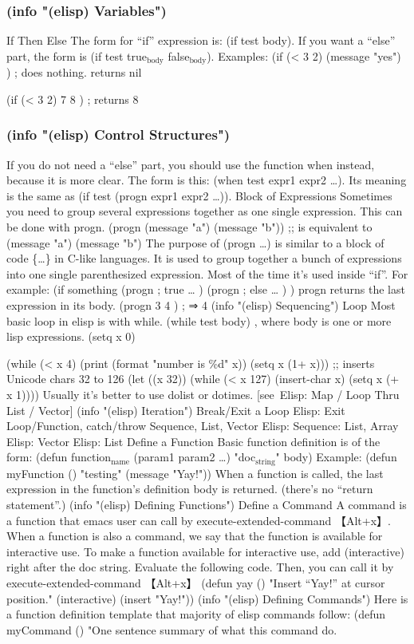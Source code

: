 \documentclass[11pt]{ctexart}
\begin{document}
{{{{\subsubsection{(info "(elisp) Variables")}
\label{sec:org789550e}
If Then Else
The form for “if” expression is: (if test body).
If you want a “else” part, the form is (if test true\(_{\text{body}}\) false\(_{\text{body}}\)).
Examples:
(if (< 3 2) (message "yes") ) ; does nothing. returns nil

(if (< 3 2) 7 8 ) ; returns 8
\subsubsection{(info "(elisp) Control Structures")}
\label{sec:orga5dca27}
If you do not need a “else” part, you should use the function when instead, because it is more clear. The form is this: (when test expr1 expr2 …). Its meaning is the same as (if test (progn expr1 expr2 …)).
Block of Expressions
Sometimes you need to group several expressions together as one single expression. This can be done with progn.
(progn (message "a") (message "b"))
;; is equivalent to
(message "a") (message "b")
The purpose of (progn …) is similar to a block of code \{…\} in C-like languages. It is used to group together a bunch of expressions into one single parenthesized expression. Most of the time it's used inside “if”. For example:
(if something
(progn ; true
…
)
(progn ; else
…
)
)
progn returns the last expression in its body.
(progn 3 4 ) ; ⇒ 4
(info "(elisp) Sequencing")
Loop
Most basic loop in elisp is with while.
(while test body)
, where body is one or more lisp expressions.
(setq x 0)

(while (< x 4)
(print (format "number is \%d" x))
(setq x (1+ x)))
;; inserts Unicode chars 32 to 126
(let ((x 32))
(while (< x 127)
(insert-char x)
(setq x (+ x 1))))
Usually it's better to use dolist or dotimes.
[see Elisp: Map / Loop Thru List / Vector]
(info "(elisp) Iteration")
Break/Exit a Loop
Elisp: Exit Loop/Function, catch/throw
Sequence, List, Vector
Elisp: Sequence: List, Array
Elisp: Vector
Elisp: List
Define a Function
Basic function definition is of the form:
(defun function\(_{\text{name}}\) (param1 param2 …) "doc\(_{\text{string}}\)" body)
Example:
(defun myFunction ()
"testing"
(message "Yay!"))
When a function is called, the last expression in the function's definition body is returned. (there's no “return statement”.)
(info "(elisp) Defining Functions")
Define a Command
A command is a function that emacs user can call by execute-extended-command 【Alt+x】.
When a function is also a command, we say that the function is available for interactive use.
To make a function available for interactive use, add (interactive) right after the doc string.
Evaluate the following code. Then, you can call it by execute-extended-command 【Alt+x】
(defun yay ()
"Insert “Yay!” at cursor position."
(interactive)
(insert "Yay!"))
(info "(elisp) Defining Commands")
Here is a function definition template that majority of elisp commands follow:
(defun myCommand ()
"One sentence summary of what this command do.

}}}}
\end{document}
